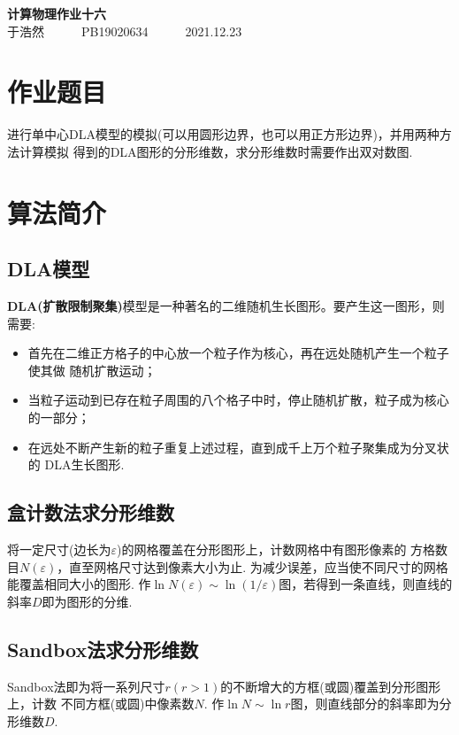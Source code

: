 \documentclass[12pt,a4paper,utf8]{ctexart}
\begin{document}
\begin{center}
    {\LARGE\textbf{计算物理作业十六}}\\
    \textrm{于浩然}~~~~~~\textrm{PB19020634}~~~~~~\textrm{2021.12.23}
\end{center}
\section{作业题目}

进行单中心DLA模型的模拟(可以用圆形边界，也可以用正方形边界)，并用两种方法计算模拟
得到的DLA图形的分形维数，求分形维数时需要作出双对数图.

\section{算法简介}
\subsection{DLA模型}

\textbf{DLA(扩散限制聚集)}模型是一种著名的二维随机生长图形。要产生这一图形，则需要:
\begin{itemize}
    \item
        首先在二维正方格子的中心放一个粒子作为核心，再在远处随机产生一个粒子使其做
        随机扩散运动；
    \item
        当粒子运动到已存在粒子周围的八个格子中时，停止随机扩散，粒子成为核心的一部分；
    \item
        在远处不断产生新的粒子重复上述过程，直到成千上万个粒子聚集成为分叉状的
        DLA生长图形.
\end{itemize}

\subsection{盒计数法求分形维数}
    将一定尺寸(边长为$\varepsilon$)的网格覆盖在分形图形上，计数网格中有图形像素的
    方格数目$N(\varepsilon)$，直至网格尺寸达到像素大小为止.
    为减少误差，应当使不同尺寸的网格能覆盖相同大小的图形. 
    作$\ln N(\varepsilon)\sim
    \ln(1/\varepsilon)$图，若得到一条直线，则直线的斜率$D$即为图形的分维.

\subsection{Sandbox法求分形维数}
    Sandbox法即为将一系列尺寸$r(r>1)$的不断增大的方框(或圆)覆盖到分形图形上，计数
    不同方框(或圆)中像素数$N$. 作$\ln N \sim \ln
    r$图，则直线部分的斜率即为分形维数$D$.
\end{document}
